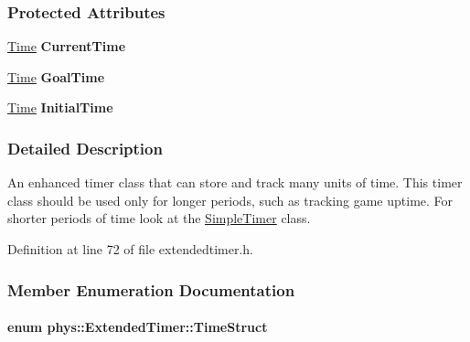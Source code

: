 \subsubsection*{Protected Attributes}
\begin{DoxyCompactItemize}
\item 
\hypertarget{classphys_1_1ExtendedTimer_aa71c8250d0a9953b00e25391c8e6d910}{
\hyperlink{structphys_1_1Time}{Time} {\bfseries CurrentTime}}
\label{dc/d7c/classphys_1_1ExtendedTimer_aa71c8250d0a9953b00e25391c8e6d910}

\item 
\hypertarget{classphys_1_1ExtendedTimer_a6dd2ddfeaf989e2c70dc8afd399d8ca8}{
\hyperlink{structphys_1_1Time}{Time} {\bfseries GoalTime}}
\label{dc/d7c/classphys_1_1ExtendedTimer_a6dd2ddfeaf989e2c70dc8afd399d8ca8}

\item 
\hypertarget{classphys_1_1ExtendedTimer_a231bf60b0b65a41095b6a4c140596531}{
\hyperlink{structphys_1_1Time}{Time} {\bfseries InitialTime}}
\label{dc/d7c/classphys_1_1ExtendedTimer_a231bf60b0b65a41095b6a4c140596531}

\end{DoxyCompactItemize}


\subsubsection{Detailed Description}
An enhanced timer class that can store and track many units of time. This timer class should be used only for longer periods, such as tracking game uptime. For shorter periods of time look at the \hyperlink{classphys_1_1SimpleTimer}{SimpleTimer} class. 

Definition at line 72 of file extendedtimer.h.



\subsubsection{Member Enumeration Documentation}
\hypertarget{classphys_1_1ExtendedTimer_a0f316e9347d1c118a157cc3c737c554b}{
\paragraph[{TimeStruct}]{\setlength{\rightskip}{0pt plus 5cm}enum {\bf phys::ExtendedTimer::TimeStruct}}\hfill}
\label{dc/d7c/classphys_1_1ExtendedTimer_a0f316e9347d1c118a157cc3c737c554b}


